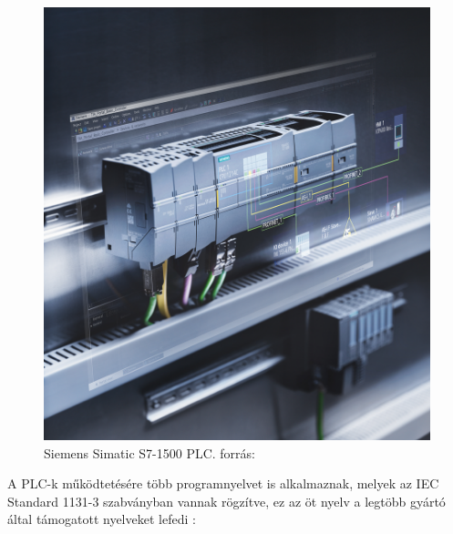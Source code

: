 \begin{figure}
	\centering
	\includegraphics[width=\columnwidth*5/10]{figures/siemens_plc.jpeg}
	\caption{Siemens Simatic S7-1500 PLC. forrás: \cite{siemens_plc}}
	\label{plckep}
\end{figure}
A PLC-k működtetésére több programnyelvet is alkalmaznak, melyek az IEC Standard 1131-3 szabványban vannak rögzítve, ez az öt nyelv a legtöbb gyártó által támogatott nyelveket lefedi \cite{Baresi1998}: 
